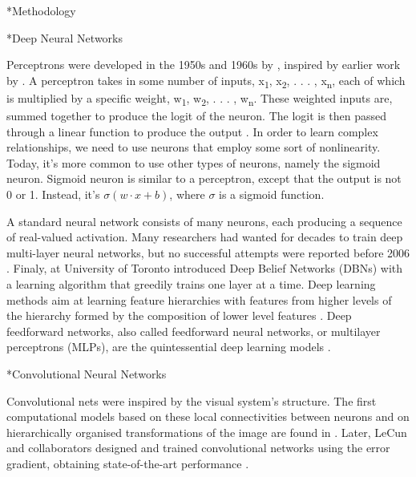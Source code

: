 \documentclass[twocolumn, a4paper,10pt]{article}
\makeatletter
\renewcommand\section{\@startsection{section}{1}{\z@}{0.25cm}{0.1cm}{\normalfont\large\bfseries}}
\renewcommand\subsection{\@startsection{subsection}{1}{\z@}{0.2cm}{0.1cm}{\normalfont\normalsize\bfseries}}
\renewcommand\subsubsection{\@startsection{subsection}{1}{\z@}{0.2cm}{0.1cm}{\normalfont\normalsize\itshape}}
\makeatother
\begin{document}
\section*{Methodology}

\subsection*{Deep Neural Networks}

Perceptrons were developed in the 1950s and 1960s by \cite{RN1279}, inspired by earlier work by \cite{RN1280}. A perceptron takes in some number of inputs, x\textsubscript{1}, x\textsubscript{2}, . . . , x\textsubscript{n}, each of which is multiplied by a specific weight, w\textsubscript{1}, w\textsubscript{2}, . . . , w\textsubscript{n}. These weighted inputs are, summed together to produce the logit of the neuron. The logit is then passed through a linear function to produce the output \citep{RN1281}. In order to learn complex relationships, we need to use neurons that employ some sort of nonlinearity. Today, it's more common to use other types of neurons, namely the sigmoid neuron. Sigmoid neuron is similar to a perceptron, except that the output is not 0 or 1. Instead, it's \( \sigma (w⋅x+b) \), where \( \sigma\) is a sigmoid function.

A standard neural network consists of many neurons, each producing a sequence of real-valued activation. Many researchers had wanted for decades to train deep multi-layer neural networks, but no successful attempts were reported before 2006 \citep{RN1284}. Finaly, \cite{RN1285} at University of Toronto introduced Deep Belief Networks (DBNs) with a learning algorithm that greedily trains one layer at a time. Deep learning methods aim at learning feature hierarchies with features from higher levels of the hierarchy formed by the composition of lower level features \citep{RN1284}. Deep feedforward networks, also called feedforward neural networks, or multilayer perceptrons (MLPs), are the quintessential deep learning models \citep{RN1282}.

\subsubsection*{Convolutional Neural Networks}

Convolutional nets were inspired by the visual system’s structure. The first computational models based on these local connectivities between neurons and on hierarchically organised transformations of the image are found in \cite{RN1286}. Later, LeCun and collaborators designed and trained convolutional networks using the error gradient, obtaining state-of-the-art performance \citep{RN1287}.
\end{document}
